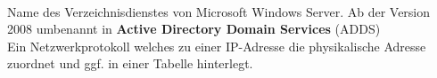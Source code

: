 \thispagestyle{empty}
\begin{acronym}
	\\
	Name des Verzeichnisdienstes von Microsoft Windows Server. Ab der Version 2008 umbenannt in \textbf{Active Directory Domain Services} (ADDS)
	\\
	Ein Netzwerkprotokoll welches zu einer IP-Adresse die physikalische Adresse zuordnet und ggf. in einer Tabelle hinterlegt.
\end{acronym}
